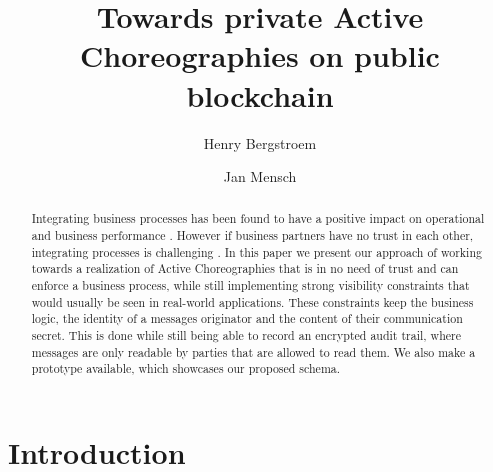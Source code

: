 \documentclass[runningheads]{llncs}
\begin{document}
%
\title{Towards private Active Choreographies on public blockchain }
%
%
\author{Henry Bergstroem \and
Jan Mensch}
%
%


%
\maketitle              %
%
\begin{abstract}
    Integrating business processes has been found to have a positive impact on operational and business performance \cite{flynn2010impact,narayanan2011antecedents}. However if business partners have no trust in each other, integrating processes is challenging \cite{panayides2009impact}. In this paper we present our approach of working towards a realization of Active Choreographies that is in no need of trust and can enforce a business process, while still implementing strong visibility constraints that would usually be seen in real-world applications. These constraints keep the business logic, the identity of a messages originator and the content of their communication secret. This is done while still being able to record an encrypted audit trail, where messages are only readable by parties that are allowed to read them. We also make a prototype available, which showcases our proposed schema.
\end{abstract}

\section{Introduction} \label{sec:intro}
\end{document}
